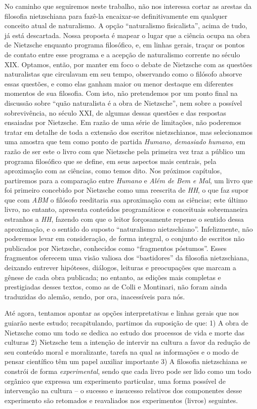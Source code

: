 \documentclass[
	12pt,				%
	openright,			%
	oneside,			%
	a4paper,			%
	english,			%
	french,				%
	spanish,			%
	brazil				%
	]{abntex2}
\newcommand{\Hum}{\textit{Humano}\xspace}
\begin{document}
	No caminho que seguiremos neste trabalho, não nos interessa cortar as arestas da filosofia nietzschiana para fazê-la encaixar-se definitivamente em qualquer conceito atual de naturalismo. A opção “naturalismo fisicalista”, acima de tudo, já está descartada. Nossa proposta é mapear o lugar que a ciência ocupa na obra de Nietzsche enquanto programa filosófico, e, em linhas gerais, traçar os pontos de contato entre esse programa e a acepção de naturalismo corrente no século XIX. Optamos, então, por manter em foco o debate de Nietzsche com as questões naturalistas que circulavam em seu tempo, observando como o filósofo absorve essas questões, e como elas ganham maior ou menor destaque em diferentes momentos de sua filosofia. Com isto, não pretendemos por um ponto final na discussão sobre “quão naturalista é a obra de Nietzsche”, nem sobre a possível sobrevivência, no século XXI, de algumas dessas questões e das respostas ensaiadas por Nietzsche. Em razão de uma série de limitações, não poderemos tratar em detalhe de toda a extensão dos escritos nietzschianos, mas selecionamos uma amostra que tem como ponto de partida \textit{Humano, demasiado humano}, em razão de ser este o livro com que Nietzsche pela primeira vez traz a público um programa filosófico que se define, em seus aspectos mais centrais, pela aproximação com as ciências, como temos dito. Nos próximos capítulos, partiremos para a comparação entre \Hum e \textit{Além de Bem e Mal}, um livro que foi primeiro concebido por Nietzsche como uma reescrita de \textit{HH}, o que faz supor que com \textit{ABM} o filósofo reeditaria sua aproximação com as ciências; este último livro, no entanto, apresenta conteúdos programáticos e conceituais sobremaneira estranhos a \textit{HH}, fazendo com que o leitor forçosamente repense o sentido dessa aproximação, e o sentido do suposto “naturalismo nietzschiano”. Infelizmente, não poderemos levar em consideração, de forma integral, o conjunto de escritos não publicados por Nietzsche, conhecidos como “fragmentos póstumos”. Esses fragmentos oferecem uma visão valiosa dos “bastidores” da filosofia nietzschiana, deixando entrever hipóteses, diálogos, leituras e preocupações que marcam a gênese de cada obra publicada; no entanto, as edições mais completas e prestigiadas desses textos, como as de Colli e Montinari, não foram ainda traduzidas do alemão, sendo, por ora, inacessíveis para nós.

	Até agora, tentamos apontar as opções interpretativas e linhas gerais que nos guiarão neste estudo; recapitulando, partimos da suposição de que: 1) A obra de Nietzsche como um todo se dedica ao estudo dos processos de vida e morte das culturas 2) Nietzsche tem a intenção de intervir na cultura a favor da redução de seu conteúdo moral e moralizante, tarefa na qual as informações e o modo de pensar científico têm um papel auxiliar importante 3) A filosofia nietzschiana se constrói de forma \textit{experimental}, sendo que cada livro pode ser lido como um todo orgânico que expressa um experimento particular, uma forma possível de intervenção na cultura – o sucesso e insucesso relativos dos componentes desse experimento são retomados e reavaliados nos experimentos (livros) seguintes.
\end{document}
